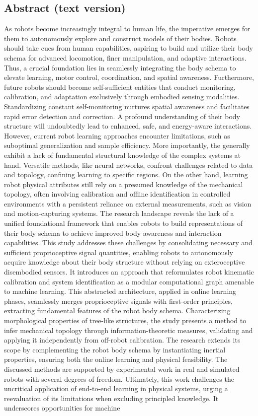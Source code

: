 \documentclass[12pt, a4paper]{article}
\begin{document}
\subsection*{Abstract (text version)}
As robots become increasingly integral to human life, the imperative emerges for them to autonomously explore and construct models of their bodies. Robots should take cues from human capabilities, aspiring to build and utilize their body schema for advanced locomotion, finer manipulation, and adaptive interactions. Thus, a crucial foundation lies in seamlessly integrating the body schema to elevate learning, motor control, coordination, and spatial awareness. Furthermore, future robots should become self-sufficient entities that conduct monitoring, calibration, and adaptation exclusively through embodied sensing modalities. Standardizing constant self-monitoring nurtures spatial awareness and facilitates rapid error detection and correction. A profound understanding of their body structure will undoubtedly lead to enhanced, safe, and energy-aware interactions. However, current robot learning approaches encounter limitations, such as suboptimal generalization and sample efficiency. More importantly,  the generally exhibit a lack of fundamental structural knowledge of the complex systems at hand. Versatile methods, like neural networks, confront challenges related to data and topology, confining learning to specific regions. On the other hand, learning robot physical attributes still rely on a presumed knowledge of the mechanical topology, often involving calibration and offline identification in controlled environments with a persistent reliance on external measurements, such as vision and motion-capturing systems. The research landscape reveals the lack of a unified foundational framework that enables robots to build representations of their body schema to achieve improved body awareness and interaction capabilities. This study addresses these challenges by consolidating necessary and sufficient proprioceptive signal quantities, enabling robots to autonomously acquire knowledge about their body structure without relying on exteroceptive disembodied sensors. It introduces an approach that reformulates robot kinematic calibration and system identification as a modular computational graph amenable to machine learning. This abstracted architecture, applied in online learning phases, seamlessly merges proprioceptive signals with first-order principles, extracting fundamental features of the robot body schema. Characterizing morphological properties of tree-like structures, the study presents a method to infer mechanical topology through information-theoretic measures, validating and applying it independently from off-robot calibration. The research extends its scope by complementing the robot body schema by instantiating inertial properties, ensuring both the online learning and physical feasibility. The discussed methods are supported by experimental work in real and simulated robots with several degrees of freedom. Ultimately, this work challenges the uncritical application of end-to-end learning in physical systems, urging a reevaluation of its limitations when excluding principled knowledge. It underscores opportunities for machine 
\end{document}
